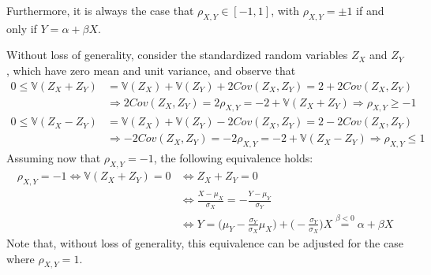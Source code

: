 \documentclass{report}
\begin{document}
Furthermore, it is always the case that $\displaystyle \rho_{X, Y} \in [-1, 1]$, with $\displaystyle \rho_{X, Y} = \pm 1$ if and only if $\displaystyle Y = \alpha + \beta X$.
\begin{proofbox}
    Without loss of generality, consider the standardized random variables $\displaystyle Z_X$ and $\displaystyle Z_Y$, which have zero mean and unit variance, and observe that
    \begin{align*}
        0 \leq \mathbb{V}(Z_X + Z_Y)
            &= \mathbb{V}(Z_X) + \mathbb{V}(Z_Y) + 2Cov(Z_X, Z_Y) = 2 + 2Cov(Z_X, Z_Y) \\
            &\Rightarrow 2Cov(Z_X, Z_Y) = 2\rho_{X, Y} = -2 + \mathbb{V}(Z_X + Z_Y) \Rightarrow \rho_{X, Y} \ge -1 \\
        0 \leq \mathbb{V}(Z_X - Z_Y)
            &= \mathbb{V}(Z_X) + \mathbb{V}(Z_Y) - 2Cov(Z_X, Z_Y) = 2 - 2Cov(Z_X, Z_Y) \\
            &\Rightarrow -2Cov(Z_X, Z_Y) = -2\rho_{X, Y} = -2 + \mathbb{V}(Z_X - Z_Y) \Rightarrow \rho_{X, Y} \leq 1
    \end{align*}
    Assuming now that $\displaystyle \rho_{X, Y} = -1$, the following equivalence holds:
    \begin{align*}
        \rho_{X, Y} = -1 \Leftrightarrow \mathbb{V}(Z_X + Z_Y) = 0
            &\Leftrightarrow Z_X + Z_Y = 0 \\
            &\Leftrightarrow \frac{X - \mu_X}{\sigma_X} = -\frac{Y - \mu_Y}{\sigma_Y} \\
            &\Leftrightarrow Y = \Bigg(\mu_Y - \frac{\sigma_Y}{\sigma_X}\mu_X\Bigg) + \Bigg(-\frac{\sigma_Y}{\sigma_X}\Bigg)X \stackrel{\beta < 0}{=} \alpha + \beta X
    \end{align*}
    Note that, without loss of generality, this equivalence can be adjusted for the case where $\displaystyle \rho_{X, Y} = 1$.
\end{proofbox}
\end{document}
